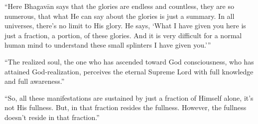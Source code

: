 \enquote{Here Bhagavān says that the glories are endless and countless, they are so numerous, that what He can say about the glories is just a summary. In all universes, there’s no limit to His glory. He says, \enquote{What I have given you here is just a fraction, a portion, of these glories. And it is very difficult for a normal human mind to understand these small splinters I have given you.}}

\enquote{The realized soul, the one who has ascended toward God consciousness, who has attained God-realization, perceives the eternal Supreme Lord with full knowledge and full awareness.}

\enquote{So, all these manifestations are sustained by just a fraction of Himself alone, it’s not His fullness. But, in that fraction resides the fullness. However, the fullness doesn’t reside in that fraction.}
